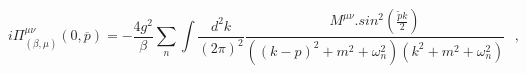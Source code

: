 \begin{equation}
i\Pi^{\mu\nu}_{(\beta,\mu)} (0,\overline p) = -\frac {4g^2}{\beta} \sum_{n}
\int \frac{d^2k}{(2\pi)^2} \frac { {\mathit {M} }^{\mu\nu}. sin^2(\frac
{\tilde p k}{2}) }{( (k-p)^2 + m^2 + \omega_{n}^2)(k^2 + m^2 +
\omega_{n}^2 )} ~~~,
\end{equation}

